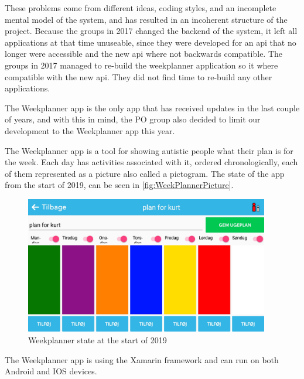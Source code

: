 These problems come from different ideas, coding styles, and an incomplete mental model of the system, and has resulted in an incoherent structure of the project. Because the groups in 2017 \cite{SW608F18} changed the backend of the system, it left all applications at that time unuseable, since they were developed for an \gls{api} that no longer were accessible and the new \gls{api} where not backwards compatible. The groups in 2017 managed to re-build the weekplanner application so it where compatible with the new \gls{api}. They did not find time to re-build any other applications.

The Weekplanner app is the only app that has received updates in the last couple of years, and with this in mind, the \gls{PO} group also decided to limit our development to the Weekplanner app this year.

The Weekplanner app is a tool for showing autistic people what their plan is for the week. Each day has activities associated with it, ordered chronologically, each of them represented as a picture also called a pictogram. The state of the app from the start of 2019, can be seen in \autoref{fig:WeekPlannerPicture}.

\begin{figure}[H]
        \begin{center}
            \includegraphics[width=0.95\textwidth]{figures/WeekPlannerPicture}
        \end{center}
        \caption{Weekplanner state at the start of 2019}
        \label{fig:WeekPlannerPicture}
\end{figure}

The Weekplanner app is using the Xamarin framework and can run on both Android and IOS devices.

